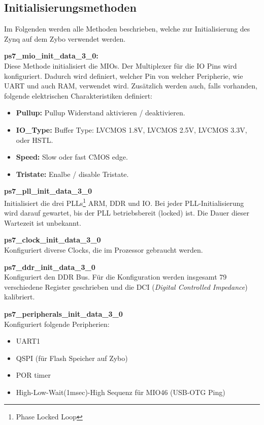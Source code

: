 

\subsection{Initialisierungsmethoden}
Im Folgenden werden alle Methoden beschrieben, welche zur Initialisierung des Zynq auf dem Zybo verwendet werden.

\textbf{ps7\_mio\_init\_data\_3\_0:}\\
Diese Methode initialisiert die MIOs.
Der Multiplexer für die IO Pins wird konfiguriert.
Dadurch wird definiert, welcher Pin von welcher Peripherie, wie UART und auch RAM, verwendet wird.
Zusätzlich werden auch, falls vorhanden, folgende elektrischen Charakteristiken definiert:
\begin{itemize}
\item \textbf{Pullup:} Pullup Widerstand aktivieren / deaktivieren.
\item \textbf{IO\_Type:} Buffer Type: LVCMOS 1.8V, LVCMOS 2.5V, LVCMOS 3.3V,  oder HSTL.
\item \textbf{Speed:} Slow oder fast CMOS edge.
\item \textbf{Tristate:} Enalbe / disable Tristate.
\end{itemize} 


\textbf{ps7\_pll\_init\_data\_3\_0}\\
Initialisiert die drei PLLs\footnote{Phase Locked Loop} ARM, DDR und IO.
Bei jeder PLL-Initialisierung wird darauf gewartet, bis der PLL betriebsbereit (locked) ist.
Die Dauer dieser Wartezeit ist unbekannt.

\textbf{ps7\_clock\_init\_data\_3\_0}\\
Konfiguriert diverse Clocks, die im Prozessor gebraucht werden.

\textbf{ps7\_ddr\_init\_data\_3\_0}\\
Konfiguriert den DDR Bus.
Für die Konfiguration werden insgesamt 79 verschiedene Register geschrieben und die DCI (\textit{Digital Controlled Impedance}) kalibriert.

\textbf{ps7\_peripherals\_init\_data\_3\_0}\\
Konfiguriert folgende Peripherien:
\begin{itemize}
\item UART1
\item QSPI (für Flash Speicher auf Zybo)
\item POR timer
\item High-Low-Wait(1msec)-High Sequenz für MIO46 (USB-OTG Ping)
\end{itemize}  




